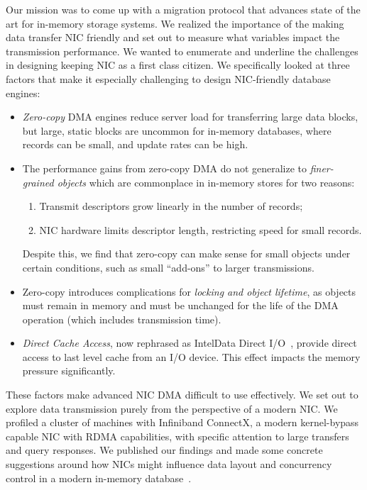 Our mission was to come up with a migration protocol that advances state of the art for in-memory storage systems.
We realized the importance of the making data transfer NIC friendly and set out to measure what variables impact the 
transmission performance. We wanted to enumerate and underline the challenges in designing keeping NIC as a first class citizen.
We specifically looked at three factors that make it especially challenging to design NIC-friendly
database engines:
\begin{itemize}
  \item {\em Zero-copy} DMA engines reduce server load for transferring large data
    blocks, but large, static blocks are uncommon for in-memory databases,
    where records can be small, and update rates can be high.
  \item The performance gains from zero-copy DMA do not generalize to
      {\em finer-grained objects} which are commonplace in in-memory stores for two reasons:
      \begin{enumerate}
        \item Transmit descriptors grow linearly in the number of records;
        \item NIC hardware limits descriptor length, restricting speed for small records.
      \end{enumerate}
      Despite this, we find that zero-copy can make sense for small objects under certain conditions, such as
      small ``add-ons'' to larger transmissions.
   \item Zero-copy introduces complications for \emph{locking and object
      lifetime}, as objects must remain in memory and must be
      unchanged for the life of the DMA operation (which includes transmission
      time).
  \item {\em Direct Cache Access}, now rephrased as Intel\textregistered  Data Direct I/O~\cite{ddio},
      provide direct access to last level cache from an I/O device. This effect
      impacts the memory pressure significantly.

\end{itemize}


These factors make advanced NIC DMA difficult to use effectively. We set out to explore data 
transmission purely from the perspective of a modern NIC. We profiled a cluster of machines with
Infiniband ConnectX, a modern kernel-bypass capable NIC
with RDMA capabilities, with specific attention to large transfers and query responses.
We published our findings and made some concrete suggestions around how NICs might
influence data layout and concurrency control in a modern in-memory 
database~\cite{KesavanRicciStutsman:IMDM16}. 


